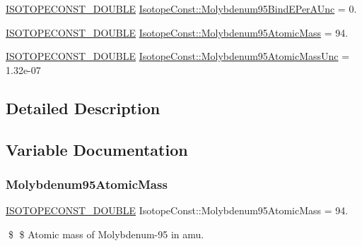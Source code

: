 \begin{DoxyCompactItemize}
\mbox{\hyperlink{group___isotope_const-_macros_ga8f45a7272ce02c0b4c65c44636ed719a}{I\+S\+O\+T\+O\+P\+E\+C\+O\+N\+S\+T\+\_\+\+D\+O\+U\+B\+LE}} \mbox{\hyperlink{group___isotope_const-_molybdenum-_mo95_gae50d8524526c41331a65a460047f4a4f}{Isotope\+Const\+::\+Molybdenum95\+Bind\+E\+Per\+A\+Unc}} = 0.
\item 
\mbox{\hyperlink{group___isotope_const-_macros_ga8f45a7272ce02c0b4c65c44636ed719a}{I\+S\+O\+T\+O\+P\+E\+C\+O\+N\+S\+T\+\_\+\+D\+O\+U\+B\+LE}} \mbox{\hyperlink{group___isotope_const-_molybdenum-_mo95_ga281cfe79ecd65567da430aa8b1f98b64}{Isotope\+Const\+::\+Molybdenum95\+Atomic\+Mass}} = 94.
\item 
\mbox{\hyperlink{group___isotope_const-_macros_ga8f45a7272ce02c0b4c65c44636ed719a}{I\+S\+O\+T\+O\+P\+E\+C\+O\+N\+S\+T\+\_\+\+D\+O\+U\+B\+LE}} \mbox{\hyperlink{group___isotope_const-_molybdenum-_mo95_gad6d69f1edad23ce6eb64821570793cc3}{Isotope\+Const\+::\+Molybdenum95\+Atomic\+Mass\+Unc}} = 1.\+32e-\/07
\end{DoxyCompactItemize}


\subsection{Detailed Description}


\subsection{Variable Documentation}
\mbox{\label{group___isotope_const-_molybdenum-_mo95_ga281cfe79ecd65567da430aa8b1f98b64}} 
\subsubsection{\texorpdfstring{Molybdenum95\+Atomic\+Mass}{Molybdenum95AtomicMass}}
{\footnotesize\ttfamily \mbox{\hyperlink{group___isotope_const-_macros_ga8f45a7272ce02c0b4c65c44636ed719a}{I\+S\+O\+T\+O\+P\+E\+C\+O\+N\+S\+T\+\_\+\+D\+O\+U\+B\+LE}} Isotope\+Const\+::\+Molybdenum95\+Atomic\+Mass = 94.}

\$ \$ Atomic mass of Molybdenum-\/95 in amu. \mbox{\label{group___isotope_const-_molybdenum-_mo95_gad6d69f1edad23ce6eb64821570793cc3}} 
